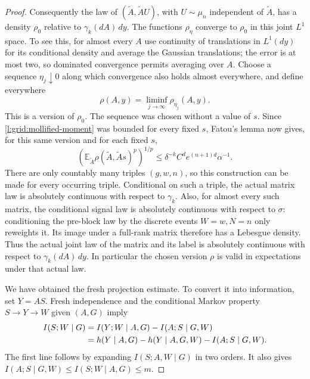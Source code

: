 \begin{proof}
Consequently the law of $(\widetilde A,\widetilde A U)$, with
$U\sim\mu_n$ independent of $\widetilde A$, has a density $\rho_0$
relative to $\gamma_k(dA)\,dy$.  The functions $\rho_\eta$ converge to
$\rho_0$ in this joint $L^1$ space.  To see this, for almost every $A$
use continuity of translations in $L^1(dy)$ for its conditional
density and average the Gaussian translations; the error is at most two,
so dominated convergence permits averaging over $A$.  Choose a sequence
$\eta_j\downarrow0$ along which convergence also holds almost everywhere,
and define everywhere
\[
 \rho(A,y)=\liminf_{j\to\infty}\rho_{\eta_j}(A,y).
\]
This is a version of $\rho_0$.  The sequence was chosen without a value
of $s$.  Since \eqref{l:grid:mollified-moment} was bounded for every
fixed $s$, Fatou's lemma now gives, for this same version and for each
fixed $s$,
\begin{equation}\label{l:grid:diagonal-moment}
 \left(\mathbb E_{\widetilde A}
       \rho(\widetilde A,\widetilde A s)^p\right)^{1/p}
 \le\delta^{-k}C^de^{(n+1)d}\alpha^{-1}.
\end{equation}
There are only countably many triples $(g,w,n)$, so this construction
can be made for every occurring triple.  Conditional on such a triple,
the actual matrix law is absolutely continuous with respect to
$\gamma_k$.  Also, for almost every such matrix, the conditional signal
law is absolutely continuous with respect to $\sigma$: conditioning the
pre-block law by the discrete events $W=w,N=n$ only reweights it.
Its image under a full-rank matrix therefore has a Lebesgue density.
Thus the actual joint law of the matrix and its label is absolutely
continuous with respect to $\gamma_k(dA)\,dy$.  In particular the
chosen version $\rho$ is valid in expectations under that actual law.

We have obtained the fresh projection estimate.  To convert it into
information, set $Y=AS$.  Fresh independence and the conditional Markov
property $S\longrightarrow Y\longrightarrow W$ given $(A,G)$ imply
\begin{align}
 I(S;W\mid G)
 &=I(Y;W\mid A,G)-I(A;S\mid G,W)\notag\\
 &=h(Y\mid A,G)-h(Y\mid A,G,W)-I(A;S\mid G,W).
 \label{l:grid:information-identity}
\end{align}
The first line follows by expanding $I(S;A,W\mid G)$ in two orders.
It also gives $I(A;S\mid G,W)\le I(S;W\mid A,G)\le m$.


\end{proof}
